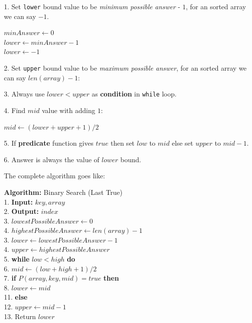 \documentclass[10pt,twocolumn]{article}
\begin{document}
	\vspace{5pt}
	
	1. Set \texttt{lower} bound value to be \emph{minimum possible answer} - \(1\), for an sorted array we can say $-1$.
	
		\begin{center}
		
		\quad \(minAnswer \gets 0\) \\
		\quad \(lower \gets minAnswer - 1\) \\ 
		\quad \(lower \gets -1\) \\		
		
		
	\end{center}
	
	2. Set \texttt{upper} bound value to be \emph{maximum possible answer}, for an sorted array we can say $len(array) - 1$:
	
	3. Always use $lower < upper$ as \textbf{condition} in \texttt{while} loop.
	
	4. Find \(mid\) value with adding $1$:
	
	\begin{center}
		$mid \gets (lower + upper + 1) / 2$
	\end{center}
	
	
	5. If \textbf{predicate} function gives $true$ then set \(low\)  to \(mid\) else set \(upper\) to \(mid - 1\).
	
	6. Answer is always the value of \(lower\) bound.
	
	\vspace*{5pt}
	
	The complete algorithm goes like:
	
	\vspace*{10pt}
	
	\noindent
	\textbf{Algorithm:} Binary Search (Last True)\\
	1. \textbf{Input:} \(key, array\) \\
	2. \textbf{Output:} \(index\) \\
	3. \(lowestPossibleAnswer \gets 0\) \\
	4. \(highestPossibleAnswer \gets len(array) - 1\) \\
	3. \(lower \gets lowestPossibleAnswer - 1\) \\
	4. \(upper \gets highestPossibleAnswer\) \\
	5. \textbf{while} \(low < high\) \textbf{ do} \\
	6. \quad\(mid \gets (low + high + 1) / 2\) \\
	7. \quad \textbf{if} \(P(array, key, mid) = true \) \textbf{ then} \\
	8. \quad \quad \(lower \gets mid\) \\
	11. \quad \textbf{else} \\
	12. \quad \quad \(upper \gets mid - 1\) \\
	13. Return \(lower\)
	
\end{document}
